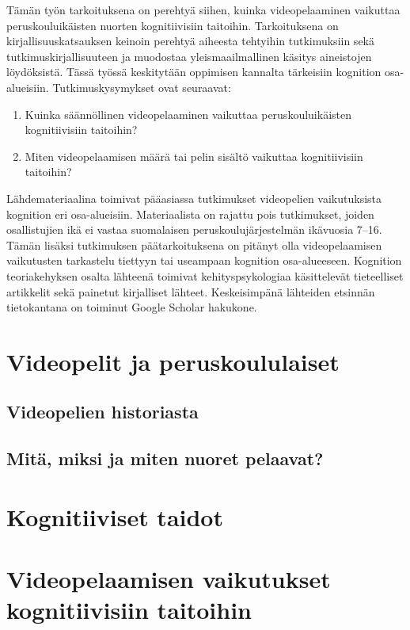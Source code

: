 \documentclass[utf8,bachelor]{gradu3}
\begin{document}
Tämän työn tarkoituksena on perehtyä siihen, kuinka videopelaaminen vaikuttaa peruskouluikäisten nuorten kognitiivisiin taitoihin. Tarkoituksena on kirjallisuuskatsauksen keinoin perehtyä aiheesta tehtyihin tutkimuksiin sekä tutkimuskirjallisuuteen ja muodostaa yleismaailmallinen käsitys aineistojen löydöksistä. Tässä työssä keskitytään oppimisen kannalta tärkeisiin kognition osa-alueisiin. Tutkimuskysymykset ovat seuraavat: 
\newpage
\begin{enumerate}
\item Kuinka säännöllinen videopelaaminen vaikuttaa peruskouluikäisten kognitiivisiin taitoihin? 
\item Miten videopelaamisen määrä tai pelin sisältö vaikuttaa kognitiivisiin taitoihin? 
\end{enumerate}

Lähdemateriaalina toimivat pääasiassa tutkimukset videopelien vaikutuksista kognition eri osa-alueisiin. Materiaalista on rajattu pois tutkimukset, joiden osallistujien ikä ei vastaa suomalaisen peruskoulujärjestelmän ikävuosia 7–16. Tämän lisäksi tutkimuksen päätarkoituksena on pitänyt olla videopelaamisen vaikutusten tarkastelu tiettyyn tai useampaan kognition osa-alueeseen. Kognition teoriakehyksen osalta lähteenä toimivat kehityspsykologiaa käsittelevät tieteelliset artikkelit sekä painetut kirjalliset lähteet.  Keskeisimpänä lähteiden etsinnän tietokantana on toiminut Google Scholar hakukone.  

\chapter{Videopelit ja peruskoululaiset}

\section{Videopelien historiasta}

\section{Mitä, miksi ja miten nuoret pelaavat?}
  
\chapter{Kognitiiviset taidot}

\chapter{Videopelaamisen vaikutukset kognitiivisiin taitoihin}
\end{document}
